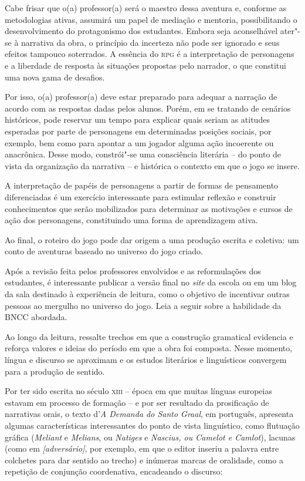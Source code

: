 \documentclass[11pt]{extarticle}
\begin{document}
Cabe frisar que o(a) professor(a) será o maestro dessa aventura e,
conforme as metodologias ativas, assumirá um papel de mediação e
mentoria, possibilitando o desenvolvimento do protagonismo dos
estudantes. Embora seja aconselhável ater"-se à narrativa da obra, o
princípio da incerteza não pode ser ignorado e seus efeitos tampouco
soterrados. A essência do \textsc{rpg} é a interpretação de personagens e a
liberdade de resposta às situações propostas pelo narrador, o que
constitui uma nova gama de desafios.

Por isso, o(a) professor(a) deve estar preparado para adequar a narração
de acordo com as respostas dadas pelos alunos. Porém, em se tratando de
cenários históricos, pode reservar um tempo para explicar quais seriam
as atitudes esperadas por parte de personagens em determinadas posições
sociais, por exemplo, bem como para apontar a um jogador alguma ação
incoerente ou anacrônica. Desse modo, constrói"-se uma consciência
literária -- do ponto de vista da organização da narrativa -- e
histórica o contexto em que o jogo se insere.

A interpretação de papéis de personagens a partir de formas de
pensamento diferenciadas é um exercício interessante para estimular
reflexão e construir conhecimentos que serão mobilizados para determinar
as motivações e cursos de ação dos personagens, constituindo uma forma
de aprendizagem ativa.

Ao final, o roteiro do jogo pode dar origem a uma produção escrita e
coletiva: um conto de aventuras baseado no universo do jogo criado. 

Após a revisão feita pelos professores envolvidos e as reformulações dos
estudantes, é interessante publicar a versão final no \emph{site} da
escola ou em um blog da sala destinado à experiência de leitura, como o
objetivo de incentivar outras pessoas ao mergulho no universo do jogo.
Leia a seguir sobre a habilidade da BNCC abordada.

Ao longo da leitura, ressalte trechos em que a construção
gramatical evidencia e reforça valores e ideias do período em que a obra
foi composta. Nesse momento, língua e discurso se aproximam e os estudos
literários e linguísticos convergem para a produção de sentido.

Por ter sido escrita no século \textsc{xiii} -- época em
que muitas línguas europeias estavam em processo de formação -- e por
ser resultado da prosificação de narrativas orais, o texto d'\emph{A
Demanda do Santo Graal}, em português, apresenta algumas características
interessantes do ponto de vista linguístico, como flutuação gráfica
(\emph{Meliant} e \emph{Melians}, ou \emph{Natiges} e \emph{Nascius, ou
Camelot e Camlot}), lacunas (como em \emph{{[}adversário{]}}, por
exemplo, em que o editor inseriu a palavra entre colchetes para dar
sentido ao trecho) e inúmeras marcas de oralidade, como a repetição de
conjunção coordenativa, encadeando o
discurso:
\end{document}
